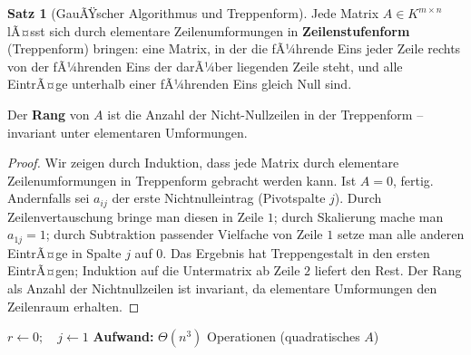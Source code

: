 ﻿\documentclass[a4paper,12pt]{report}
\theoremstyle{definition}
\newtheorem{satz}{Satz}
\begin{document}
\begin{satz}[GauÃŸscher Algorithmus und Treppenform]
    Jede Matrix $A \in K^{m \times n}$ lÃ¤sst sich durch elementare
    Zeilenumformungen in \textbf{Zeilenstufenform} (Treppenform) bringen:
    eine Matrix, in der die fÃ¼hrende Eins jeder Zeile rechts von der
    fÃ¼hrenden Eins der darÃ¼ber liegenden Zeile steht, und alle EintrÃ¤ge
    unterhalb einer fÃ¼hrenden Eins gleich Null sind.

    Der \textbf{Rang} von $A$ ist die Anzahl der Nicht-Nullzeilen in der
    Treppenform -- invariant unter elementaren Umformungen.
\end{satz}
\begin{proof}
    Wir zeigen durch Induktion, dass jede Matrix durch elementare Zeilenumformungen
    in Treppenform gebracht werden kann.
    Ist $A = 0$, fertig. Andernfalls sei $a_{ij}$ der erste Nichtnulleintrag (Pivotspalte $j$).
    Durch Zeilenvertauschung bringe man diesen in Zeile $1$; durch Skalierung
    mache man $a_{1j} = 1$; durch Subtraktion passender Vielfache von Zeile $1$
    setze man alle anderen EintrÃ¤ge in Spalte $j$ auf $0$. Das Ergebnis hat
    Treppengestalt in den ersten EintrÃ¤gen; Induktion auf die Untermatrix ab
    Zeile $2$ liefert den Rest.
    Der Rang als Anzahl der Nichtnullzeilen ist invariant, da elementare
    Umformungen den Zeilenraum erhalten.
\end{proof}


\begin{algorithm}[H]
\DontPrintSemicolon
\caption{GauÃŸscher Algorithmus}\label{alg:gauss}
$r \leftarrow 0;\quad j \leftarrow 1$\;
\;
\BlankLine
\textbf{Aufwand:} $\Theta(n^3)$ Operationen (quadratisches $A$)
\end{algorithm}
\end{document}
